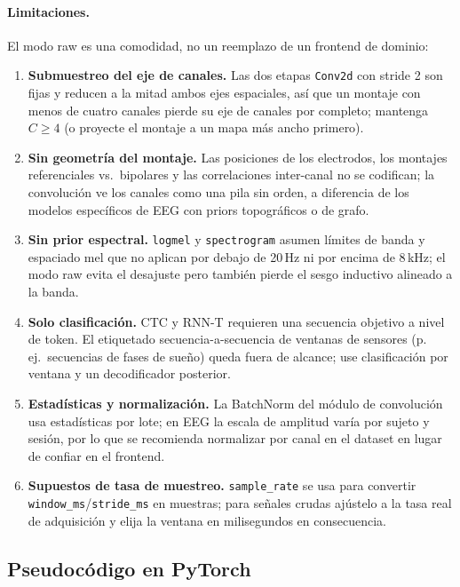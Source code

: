 \paragraph{Limitaciones.} El modo raw es una comodidad, no un reemplazo de un frontend de dominio:
\begin{enumerate}[leftmargin=*]
    \item \textbf{Submuestreo del eje de canales.} Las dos etapas \texttt{Conv2d} con stride 2 son fijas y reducen a la mitad ambos ejes espaciales, así que un montaje con menos de cuatro canales pierde su eje de canales por completo; mantenga $C \geq 4$ (o proyecte el montaje a un mapa más ancho primero).
    \item \textbf{Sin geometría del montaje.} Las posiciones de los electrodos, los montajes referenciales vs.\ bipolares y las correlaciones inter-canal no se codifican; la convolución ve los canales como una pila sin orden, a diferencia de los modelos específicos de EEG con priors topográficos o de grafo.
    \item \textbf{Sin prior espectral.} \texttt{logmel} y \texttt{spectrogram} asumen límites de banda y espaciado mel que no aplican por debajo de 20\,Hz ni por encima de 8\,kHz; el modo raw evita el desajuste pero también pierde el sesgo inductivo alineado a la banda.
    \item \textbf{Solo clasificación.} CTC y RNN-T requieren una secuencia objetivo a nivel de token. El etiquetado secuencia-a-secuencia de ventanas de sensores (p.\,ej.\ secuencias de fases de sueño) queda fuera de alcance; use clasificación por ventana y un decodificador posterior.
    \item \textbf{Estadísticas y normalización.} La BatchNorm del módulo de convolución usa estadísticas por lote; en EEG la escala de amplitud varía por sujeto y sesión, por lo que se recomienda normalizar por canal en el dataset en lugar de confiar en el frontend.
    \item \textbf{Supuestos de tasa de muestreo.} \texttt{sample\_rate} se usa para convertir \texttt{window\_ms}/\texttt{stride\_ms} en muestras; para señales crudas ajústelo a la tasa real de adquisición y elija la ventana en milisegundos en consecuencia.
\end{enumerate}

\subsection{Pseudocódigo en PyTorch}

